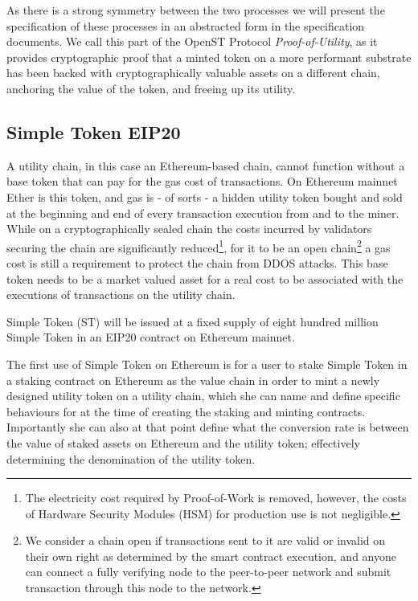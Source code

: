 \documentclass[12pt,a4paper, twocolumn]{article}
\begin{document}
As there is a strong symmetry between the two processes we will present the specification of these processes in an abstracted form in the specification documents.  We call this part of the OpenST Protocol \textit{Proof-of-Utility}, as it provides cryptographic proof that a minted token on a more performant substrate has been backed with cryptographically valuable assets on a different chain, anchoring the value of the token, and freeing up its utility.

\subsection{Simple Token EIP20}
A utility chain, in this case an Ethereum-based chain, cannot function without a base token that can pay for the gas cost of transactions. On Ethereum mainnet Ether is this token, and gas is - of sorts - a hidden utility token bought and sold at the beginning and end of every transaction execution from and to the miner.  While on a cryptographically sealed chain the costs incurred by validators securing the chain are significantly reduced\footnote{The electricity cost required by Proof-of-Work is removed, however, the costs of Hardware Security Modules (HSM) for production use is not negligible.}, for it to be an open chain\footnote{We consider a chain open if transactions sent to it are valid or invalid on their own right as determined by the smart contract execution, and anyone can connect a fully verifying node to the peer-to-peer network and submit transaction through this node to the network.} a gas cost is still a requirement to protect the chain from DDOS attacks.  This base token needs to be a market valued asset for a real cost to be associated with the executions of transactions on the utility chain. \par
Simple Token (ST) will be issued at a fixed supply of eight hundred million Simple  Token in an EIP20 contract on Ethereum mainnet. \par
The first use of Simple Token on Ethereum is for a user to stake Simple Token in a staking contract on Ethereum as the value chain in order to mint a newly designed utility token on a utility chain, which she can name and define specific behaviours for at the time of creating the staking and minting contracts.  Importantly she can also at that point define what the conversion rate is between the value of staked assets on Ethereum and the utility token; effectively determining the denomination of the utility token. \par
\end{document}
